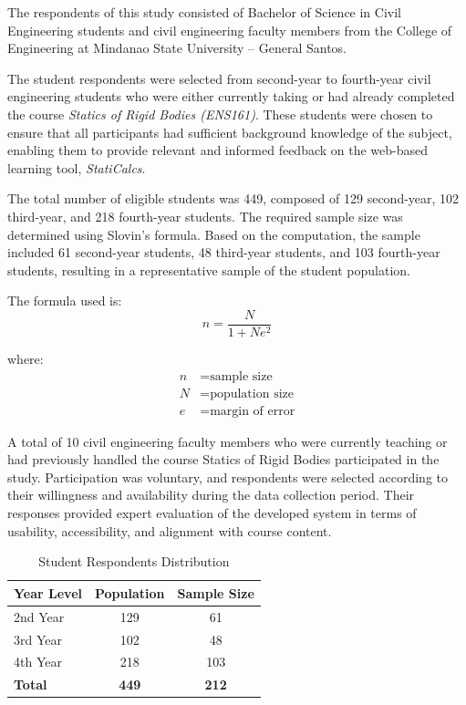 The respondents of this study consisted of Bachelor of Science in Civil Engineering students and civil engineering faculty members from the College of Engineering at Mindanao State University -- General Santos.

The student respondents were selected from second-year to fourth-year civil engineering students who were either currently taking or had already completed the course \textit{Statics of Rigid Bodies (ENS161)}. These students were chosen to ensure that all participants had sufficient background knowledge of the subject, enabling them to provide relevant and informed feedback on the web-based learning tool, \textit{StatiCalcs}.

The total number of eligible students was 449, composed of 129 second-year, 102 third-year, and 218 fourth-year students. The required sample size was determined using Slovin's formula. Based on the computation, the sample included 61 second-year students, 48 third-year students, and 103 fourth-year students, resulting in a representative sample of the student population.

The formula used is:
\[
n = \frac{N}{1 + Ne^2}
\]

where:
\begin{align*}
n &= \text{sample size} \\
N &= \text{population size} \\
e &= \text{margin of error}
\end{align*}

A total of 10 civil engineering faculty members who were currently teaching or had previously handled the course Statics of Rigid Bodies participated in the study. Participation was voluntary, and respondents were selected according to their willingness and availability during the data collection period. Their responses provided expert evaluation of the developed system in terms of usability, accessibility, and alignment with course content.
\begin{table}[H]
\centering
\caption{Student Respondents Distribution}
\small
\renewcommand{\arraystretch}{1.3}

\begin{tabular}{lcc}
\hline
\textbf{Year Level} & \textbf{Population} & \textbf{Sample Size}\\
\hline
2nd Year & 129 & 61\\
3rd Year & 102 & 48\\
4th Year & 218 & 103\\
\hline
\textbf{Total} & \textbf{449} & \textbf{212}\\
\hline
\end{tabular}
\end{table}

